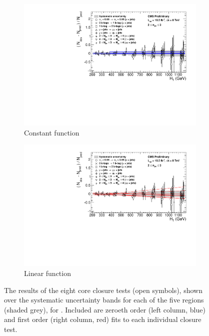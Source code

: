 \begin{figure}[p]
  \centering
  \begin{subfigure}[b]{0.9\textwidth}
    \includegraphics[width=\textwidth]{Figs/syst/v0/le3j/summary_plot_pol0}
    \caption{Constant function}
    \label{fig:closure_fit_le3j_pol0}
  \end{subfigure}
  \begin{subfigure}[b]{0.9\textwidth}
    \includegraphics[width=\textwidth]{Figs/syst/v0/le3j/summary_plot_pol1}
    \caption{Linear function}
    \label{fig:closure_fit_le3j_pol1}
  \end{subfigure}
  \caption{The results of the eight core closure tests (open symbols), shown 
  over the systematic uncertainty bands for each of the five \HT regions
  (shaded grey), for \njlow. Included are zeroeth order (left column, blue)
  and first order (right column, red) fits to each individual closure test.}
  \label{fig:closure_fits_le3j}
\end{figure}


